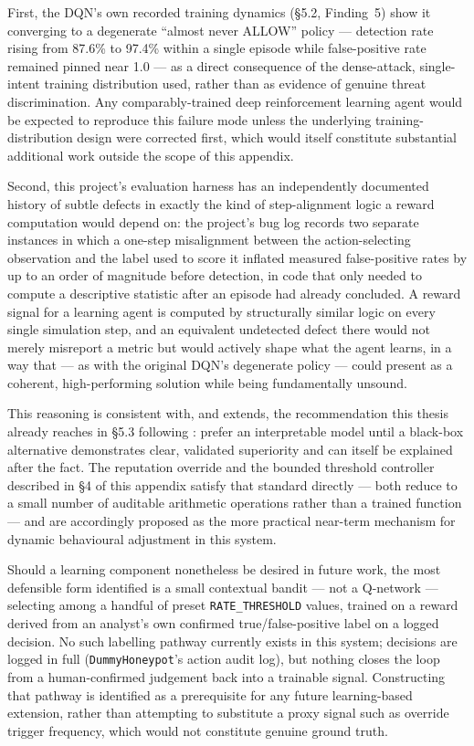 First, the DQN's own recorded training dynamics (\S5.2, Finding~5) show
it converging to a degenerate ``almost never ALLOW'' policy --- detection
rate rising from 87.6\% to 97.4\% within a single episode while
false-positive rate remained pinned near 1.0 --- as a direct consequence
of the dense-attack, single-intent training distribution used, rather
than as evidence of genuine threat discrimination. Any comparably-trained
deep reinforcement learning agent would be expected to reproduce this
failure mode unless the underlying training-distribution design were
corrected first, which would itself constitute substantial additional
work outside the scope of this appendix.

Second, this project's evaluation harness has an independently documented
history of subtle defects in exactly the kind of step-alignment logic a
reward computation would depend on: the project's bug log records two
separate instances in which a one-step misalignment between the
action-selecting observation and the label used to score it inflated
measured false-positive rates by up to an order of magnitude before
detection, in code that only needed to compute a descriptive statistic
after an episode had already concluded. A reward signal for a learning
agent is computed by structurally similar logic on every single
simulation step, and an equivalent undetected defect there would not
merely misreport a metric but would actively shape what the agent learns,
in a way that --- as with the original DQN's degenerate policy --- could
present as a coherent, high-performing solution while being fundamentally
unsound.

This reasoning is consistent with, and extends, the recommendation this
thesis already reaches in \S5.3 following \citet{rudin2019stop}: prefer
an interpretable model until a black-box alternative demonstrates clear,
validated superiority and can itself be explained after the fact. The
reputation override and the bounded threshold controller described in
\S4 of this appendix satisfy that standard directly --- both reduce to a
small number of auditable arithmetic operations rather than a trained
function --- and are accordingly proposed as the more practical near-term
mechanism for dynamic behavioural adjustment in this system.

Should a learning component nonetheless be desired in future work, the
most defensible form identified is a small contextual bandit --- not a
Q-network --- selecting among a handful of preset
\texttt{RATE\_THRESHOLD} values, trained on a reward derived from an
analyst's own confirmed true/false-positive label on a logged decision.
No such labelling pathway currently exists in this system; decisions are
logged in full (\texttt{DummyHoneypot}'s action audit log), but nothing
closes the loop from a human-confirmed judgement back into a trainable
signal. Constructing that pathway is identified as a prerequisite for any
future learning-based extension, rather than attempting to substitute a
proxy signal such as override trigger frequency, which would not
constitute genuine ground truth.

